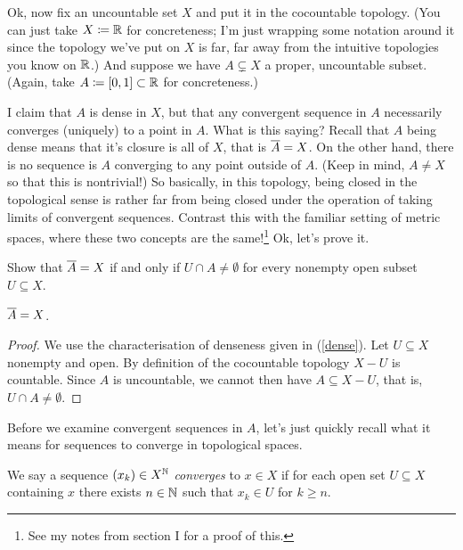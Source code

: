 \begin{nothing}
  Ok, now fix an uncountable set $X$ and put it in the cocountable
  topology. (You can just take $X \coloneqq \mathbb{R}$ for concreteness; I'm just
  wrapping some notation around it since the topology we've put on $X$
  is far, far away from the intuitive topologies you know on $\mathbb{R}$.)  And
  suppose we have $A \subsetneq X$ a proper, uncountable subset. (Again,
  take $A \coloneqq [0, 1] \subset \mathbb{R}$ for concreteness.)
\end{nothing}

\begin{nothing}
  I claim that $A$ is dense in $X$, but that any convergent sequence in
  $A$ necessarily converges (uniquely) to a point in $A$. What is this
  saying? Recall that $A$ being dense means that it's closure is all of
  $X$, that is $\overline A = X$. On the other hand, there is no sequence
  is $A$ converging to any point outside of $A$. (Keep in mind, $A \ne
  X$ so that this is nontrivial!) So basically, in this topology, being
  closed in the topological sense is rather far from being closed under
  the operation of taking limits of convergent sequences. Contrast this
  with the familiar setting of metric spaces, where these two concepts
  are the same!\footnote{See my notes from section I for a proof of
    this.} Ok, let's prove it.
\end{nothing}
\begin{exercise}
  \label{dense}
  Show that $\overline A = X$ if and only if $U \cap A \ne \emptyset$ for
  every nonempty open subset $U \subseteq X$.
\end{exercise}

\begin{lemma}
  $\overline A = X$.
\end{lemma}

\begin{proof}
  We use the characterisation of denseness given in (\ref{dense}). Let
  $U \subseteq X$ nonempty and open. By definition of the cocountable
  topology $X - U$ is countable. Since $A$ is uncountable, we cannot
  then have $A \subseteq X - U$, that is, $U \cap A \ne \emptyset$.
\end{proof}

Before we examine convergent sequences in $A$, let's just quickly
recall what it means for sequences to converge in topological spaces.

\begin{definition}
  We say a sequence $(x_k) \in X^{\mathbb{N}}$ \textit{converges} to $x \in X$
  if for each open set $U \subseteq X$ containing $x$ there exists $n
  \in \mathbb{N}$ such that $x_k \in U$ for $k \ge n$.
\end{definition}

